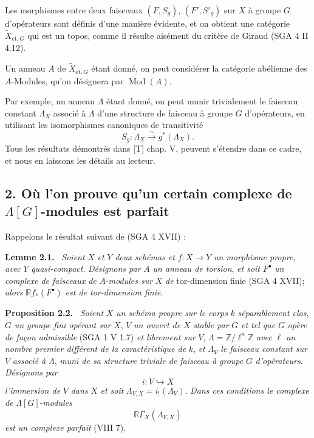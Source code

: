 \documentclass[11pt]{article}
\newenvironment{statement}[1]{\par\medskip\noindent\textbf{#1.}\ }{\par\medskip}
\newcommand{\R}{\mathbb{R}}\newcommand{\RHomCore}{\mathbb{R}\mathrm{Hom}}
\providecommand{\R}{\mathrm R}
\providecommand{\Mod}{\operatorname{Mod}}
\begin{document}
Les morphismes entre deux faisceaux $(F,S_g)$, $(F',S'_g)$ sur $X$ à groupe $G$ d'opérateurs sont définis d'une manière évidente, et on obtient une catégorie $\widetilde X_{\mathrm{et},G}$ qui est un topos, comme il résulte aisément du critère de Giraud (SGA 4 II 4.12).

Un anneau $A$ de $\widetilde X_{\mathrm{et},G}$ étant donné, on peut considérer la catégorie abélienne des $A$-Modules, qu'on désignera par $\Mod(A)$.

Par exemple, un anneau $\Lambda$ étant donné, on peut munir trivialement le faisceau constant $\Lambda_X$ associé à $\Lambda$ d'une structure de faisceau à groupe $G$ d'opérateurs, en utilisant les isomorphismes canoniques de transitivité
\[
S_g:\Lambda_X\xrightarrow{\sim}g^*(\Lambda_X).
\]
Tous les résultats démontrés dans [T] chap. V, peuvent s'étendre dans ce cadre, et nous en laissons les détails au lecteur.

\subsection*{2. Où l'on prouve qu'un certain complexe de $\Lambda[G]$-modules est parfait}

Rappelons le résultat suivant de (SGA 4 XVII) :

\begin{statement}{Lemme 2.1}
\emph{Soient} $X$ \emph{et} $Y$ \emph{deux schémas et} $f:X\to Y$ \emph{un morphisme propre}, \emph{avec} $Y$ \emph{quasi-compact}. \emph{Désignons par} $A$ \emph{un anneau de torsion}, \emph{et soit} $F^\bullet$ \emph{un complexe de faisceaux de} $A$-\emph{modules sur} $X$ \emph{de} tor-dimension finie (SGA 4 XVII); \emph{alors} $\R f_*(F^\bullet)$ \emph{est de tor-dimension finie}.
\end{statement}

\begin{statement}{Proposition 2.2}
\emph{Soient} $X$ \emph{un schéma propre sur le corps} $k$ \emph{séparablement clos}, $G$ \emph{un groupe fini opérant sur} $X$, $V$ \emph{un ouvert de} $X$ \emph{stable par} $G$ \emph{et tel que} $G$ \emph{opère de façon admissible} (SGA 1 V 1.7) \emph{et librement sur} $V$, $\Lambda=\mathbb Z/\ell^n\mathbb Z$ \emph{avec} $\ell$ \emph{un nombre premier différent de la caractéristique de} $k$, \emph{et} $\Lambda_V$ \emph{le faisceau constant sur} $V$ \emph{associé à} $\Lambda$, \emph{muni de sa structure triviale de faisceau à groupe} $G$ \emph{d'opérateurs}. \emph{Désignons par}
\[
i:V\hookrightarrow X
\]
\emph{l'immersion de} $V$ \emph{dans} $X$ \emph{et soit} $\Lambda_{V,X}=i_!(\Lambda_V)$. \emph{Dans ces conditions le complexe de} $\Lambda[G]$-\emph{modules}
\[
\R\Gamma_X(\Lambda_{V,X})
\]
\emph{est un complexe parfait} (VIII 7).
\end{statement}
\end{document}
